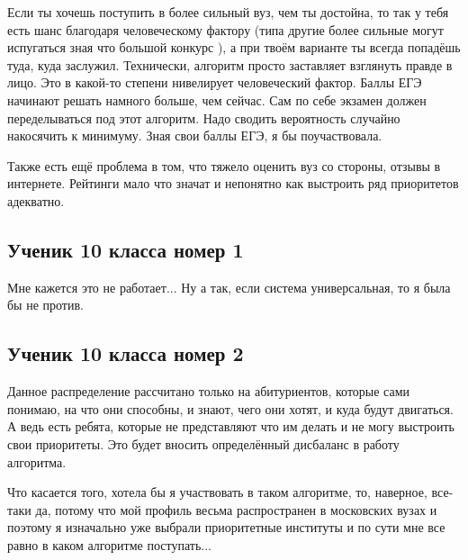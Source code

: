 \documentclass[pdftex, 11pt, a4paper]{article}
\begin{document}
Если ты хочешь поступить в более сильный вуз, чем ты достойна, то так у тебя есть шанс благодаря человеческому фактору (типа другие более сильные могут испугаться зная что большой конкурс ), а при твоём варианте ты всегда попадёшь туда, куда заслужил. Технически, алгоритм просто заставляет взглянуть правде в лицо. Это в какой-то степени нивелирует человеческий фактор. Баллы ЕГЭ начинают решать намного больше, чем сейчас. Сам по себе экзамен должен переделываться под этот алгоритм. Надо сводить вероятность случайно накосячить к минимуму. Зная свои баллы ЕГЭ, я бы поучаствовала. 

Также есть ещё проблема в том, что тяжело оценить вуз со стороны, отзывы в интернете. Рейтинги мало что значат и непонятно как выстроить ряд приоритетов адекватно.


\subsection{Ученик 10 класса номер 1}

Мне кажется это не работает... Ну а так, если система универсальная, то я была бы не против. 

\subsection{Ученик 10 класса номер 2}

Данное распределение рассчитано только на абитуриентов, которые сами понимаю, на что они способны, и знают, чего они хотят, и куда будут двигаться. А ведь есть ребята, которые не представляют что им делать и не могу выстроить свои приоритеты. Это будет вносить определённый дисбаланс в работу алгоритма. 

Что касается того, хотела бы я участвовать в таком алгоритме, то, наверное, все-таки да, потому что мой профиль весьма распространен в московских вузах и поэтому я изначально уже выбрали приоритетные институты и по сути мне все равно в каком алгоритме поступать...




\end{document}
